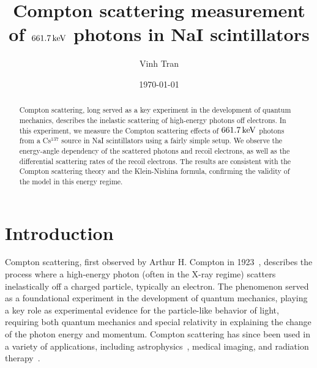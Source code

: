 \documentclass[aps,twocolumn,secnumarabic,balancelastpage,amsmath,amssymb,nofootinbib,floatfix]{revtex4-1}
\newcommand{\keV}{\,{\rm keV}}
\begin{document}
\title{Compton scattering measurement of $661.7\keV$ photons in NaI scintillators}

\author{Vinh Tran}

\date{\today}


\begin{abstract}

Compton scattering, long served as a key experiment in the development of quantum mechanics, describes the inelastic scattering of high-energy photons off electrons. In this experiment, we measure the Compton scattering effects of $661.7\keV$ photons from a Cs$^{137}$ source in NaI scintillators using a fairly simple setup. We observe the energy-angle dependency of the scattered photons and recoil electrons, as well as the differential scattering rates of the recoil electrons. The results are consistent with the Compton scattering theory and the Klein-Nishina formula, confirming the validity of the model in this energy regime.

\end{abstract}

\maketitle


\section{Introduction}
\label{sec:intro}

Compton scattering, first observed by Arthur H. Compton in 1923~\citep{Compton1923}, describes the process where a high-energy photon (often in the X-ray regime) scatters inelastically off a charged particle, typically an electron. The phenomenon served as a foundational experiment in the development of quantum mechanics, playing a key role as experimental evidence for the particle-like behavior of light, requiring both quantum mechanics and special relativity in explaining the change of the photon energy and momentum. Compton scattering has since been used in a variety of applications, including astrophysics~\citep{Birkinshaw1999}, medical imaging, and radiation therapy~\citep{Harding1997}.
\end{document}
